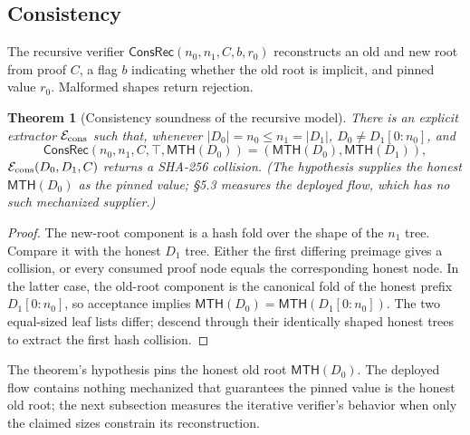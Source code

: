 \documentclass[11pt]{article}
\newtheorem{theorem}{Theorem}
\theoremstyle{remark}
\newcommand{\MTH}{\mathsf{MTH}}
\newcommand{\ConsRec}{\mathsf{ConsRec}}
\begin{document}
\subsection{Consistency}

The recursive verifier $\ConsRec(n_0,n_1,C,b,r_0)$ reconstructs an old and new
root from proof $C$, a flag $b$ indicating whether the old root is implicit,
and pinned value $r_0$. Malformed shapes return rejection.

\begin{theorem}[Consistency soundness of the recursive model]
There is an explicit extractor $\mathcal{E}_{\rm cons}$ such that, whenever
$|D_0|=n_0\le n_1=|D_1|$, $D_0\neq D_1[0{:}n_0]$, and
\[
\ConsRec(n_0,n_1,C,\top,\MTH(D_0))
   =(\MTH(D_0),\MTH(D_1)),
\]
$\mathcal{E}_{\rm cons}(D_0,D_1,C)$ returns a SHA-256 collision. (The hypothesis supplies the honest
$\MTH(D_0)$ as the pinned value; \S5.3 measures the deployed flow, which
has no such mechanized supplier.)
\end{theorem}
\begin{proof}
The new-root component is a hash fold over the shape of the $n_1$ tree. Compare
it with the honest $D_1$ tree. Either the first differing preimage gives a
collision, or every consumed proof node equals the corresponding honest node.
In the latter case, the old-root component is the canonical fold of the honest
prefix $D_1[0{:}n_0]$, so acceptance implies
$\MTH(D_0)=\MTH(D_1[0{:}n_0])$. The two equal-sized leaf lists differ; descend
through their identically shaped honest trees to extract the first hash
collision.
\end{proof}

The theorem's hypothesis pins the honest old root $\MTH(D_0)$. The deployed
flow contains nothing mechanized that guarantees the pinned value is the
honest old root; the next subsection measures the iterative verifier's
behavior when only the claimed sizes constrain its reconstruction.
\end{document}
